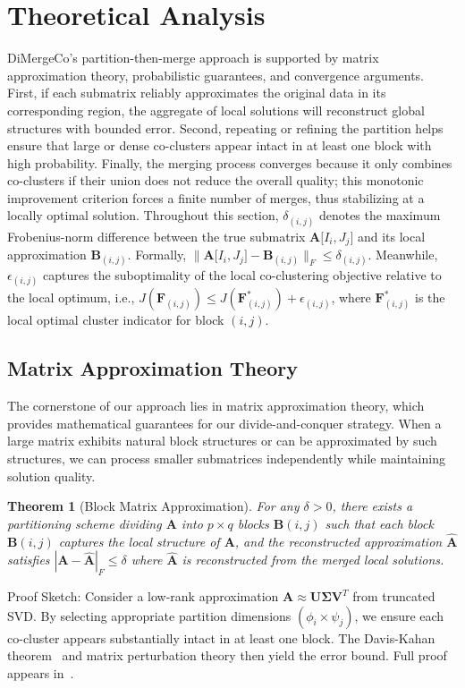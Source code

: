\documentclass[journal]{IEEEtran}
\newtheorem{theorem}{Theorem}
\renewcommand{\cite}[1]{~\autocite{#1}}
\begin{document}
\section{Theoretical Analysis}
\label{sec:theoretical_foundations}
DiMergeCo's partition-then-merge approach is supported by matrix approximation theory, probabilistic guarantees, and convergence arguments. First, if each submatrix reliably approximates the original data in its corresponding region, the aggregate of local solutions will reconstruct global structures with bounded error. Second, repeating or refining the partition helps ensure that large or dense co-clusters appear intact in at least one block with high probability. Finally, the merging process converges because it only combines co-clusters if their union does not reduce the overall quality; this monotonic improvement criterion forces a finite number of merges, thus stabilizing at a locally optimal solution.
Throughout this section, $\delta_{(i,j)}$ denotes the maximum Frobenius-norm difference between the true submatrix $\mathbf{A}\lbrack I_i,J_j\rbrack $ and its local approximation $\mathbf{B}_{(i,j)}$. Formally, $\|\mathbf{A}\lbrack I_i, J_j\rbrack - \mathbf{B}_{(i,j)}\|_F \leq \delta_{(i,j)}$. Meanwhile, $\epsilon_{(i,j)}$ captures the suboptimality of the local co-clustering objective relative to the local optimum, i.e., $J(\mathbf{F}_{(i,j)}) \leq J(\mathbf{F}_{(i,j)}^*) + \epsilon_{(i,j)}$, where $\mathbf{F}_{(i,j)}^*$ is the local optimal cluster indicator for block $(i,j)$.

\subsection{Matrix Approximation Theory}
The cornerstone of our approach lies in matrix approximation theory, which provides mathematical guarantees for our divide-and-conquer strategy. When a large matrix exhibits natural block structures or can be approximated by such structures, we can process smaller submatrices independently while maintaining solution quality.
\begin{theorem}[Block Matrix Approximation]
    For any $\delta > 0$, there exists a partitioning scheme dividing $\mathbf{A}$ into $p \times q$ blocks ${\mathbf{B}{(i,j)}}$ such that each block $\mathbf{B}{(i,j)}$ captures the local structure of $\mathbf{A}$, and the reconstructed approximation $\hat{\mathbf{A}}$ satisfies $|\mathbf{A} - \hat{\mathbf{A}}|_F \le \delta$ where $\hat{\mathbf{A}}$ is reconstructed from the merged local solutions.
\end{theorem}
Proof Sketch: Consider a low-rank approximation $\mathbf{A} \approx \mathbf{U}\mathbf{\Sigma}\mathbf{V}^T$ from truncated SVD. By selecting appropriate partition dimensions $(\phi_i \times \psi_j)$, we ensure each co-cluster appears substantially intact in at least one block. The Davis-Kahan theorem\cite{stewart1993MatrixPerturbationTheory} and matrix perturbation theory then yield the error bound. Full proof appears in~.
\end{document}
